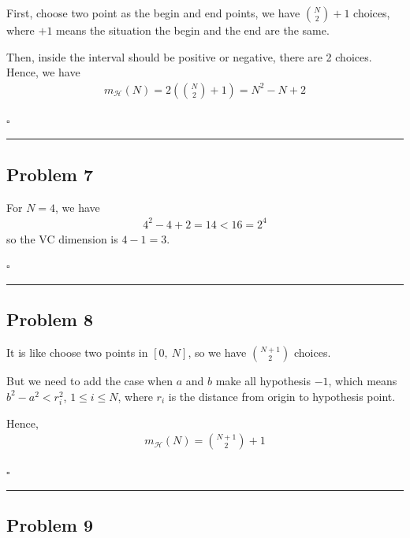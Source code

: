 \documentclass[12pt]{article}
\newcommand*{\QEDB}{\hfill\ensuremath{\square}}
\newcommand{\SBrackets}[1]{\left[#1\right]}
\newcommand{\ParTh}[1]{\left(#1\right)}
\newcommand{\horrule}[1]{\rule{\linewidth}{#1}}
\begin{document}
First, choose two point as the begin and end points, we have $\binom{N}{2}+1$ choices, where $+1$ means the situation the begin and the end are the same.

Then, inside the interval should be positive or negative, there are 2 choices. Hence, we have
\begin{align}
m_{\mathcal{H}}\ParTh{N}=2\ParTh{\binom{N}{2}+1}=N^2-N+2
\end{align}

\QEDB

\horrule{0.5pt}

\subsection*{Problem 7}

For $N=4$, we have
\begin{align}
4^2-4+2=14<16=2^4
\end{align}
so the VC dimension is $4-1=3$.

\QEDB

\horrule{0.5pt}

\subsection*{Problem 8}

It is like choose two points in $\SBrackets{0,~N}$, so we have $\binom{N+1}{2}$ choices.

But we need to add the case when $a$ and $b$ make all hypothesis $-1$, which means $b^2 - a^2 < r^2_i$, $1\leq i\leq N$, where $r_i$ is the distance from origin to hypothesis point.

Hence,
\begin{align}
m_{\mathcal{H}}\ParTh{N}=\binom{N+1}{2}+1
\end{align}

\QEDB

\horrule{0.5pt}

\subsection*{Problem 9}
\end{document}
